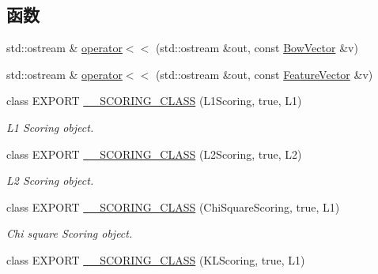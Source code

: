 \subsection*{函数}
\begin{DoxyCompactItemize}
\item 
std\-::ostream \& \hyperlink{namespaceDBoW2_a06d2058b1bde1cdc49f277fec62073e2}{operator$<$$<$} (std\-::ostream \&out, const \hyperlink{classDBoW2_1_1BowVector}{Bow\-Vector} \&v)
\item 
std\-::ostream \& \hyperlink{namespaceDBoW2_ac65e2bfb945a77c5294d0300a4fed49c}{operator$<$$<$} (std\-::ostream \&out, const \hyperlink{classDBoW2_1_1FeatureVector}{Feature\-Vector} \&v)
\item 
\hypertarget{namespaceDBoW2_a366d1d4a75ab8276e171af0aaa04b29b}{class E\-X\-P\-O\-R\-T \hyperlink{namespaceDBoW2_a366d1d4a75ab8276e171af0aaa04b29b}{\-\_\-\-\_\-\-S\-C\-O\-R\-I\-N\-G\-\_\-\-C\-L\-A\-S\-S} (L1\-Scoring, true, L1)}\label{namespaceDBoW2_a366d1d4a75ab8276e171af0aaa04b29b}

\begin{DoxyCompactList}\small\item\em L1 Scoring object. \end{DoxyCompactList}\item 
\hypertarget{namespaceDBoW2_a38216a543c4968d22bf2ffd2178e299c}{class E\-X\-P\-O\-R\-T \hyperlink{namespaceDBoW2_a38216a543c4968d22bf2ffd2178e299c}{\-\_\-\-\_\-\-S\-C\-O\-R\-I\-N\-G\-\_\-\-C\-L\-A\-S\-S} (L2\-Scoring, true, L2)}\label{namespaceDBoW2_a38216a543c4968d22bf2ffd2178e299c}

\begin{DoxyCompactList}\small\item\em L2 Scoring object. \end{DoxyCompactList}\item 
\hypertarget{namespaceDBoW2_adc330022cadf004b7ed5b84203287039}{class E\-X\-P\-O\-R\-T \hyperlink{namespaceDBoW2_adc330022cadf004b7ed5b84203287039}{\-\_\-\-\_\-\-S\-C\-O\-R\-I\-N\-G\-\_\-\-C\-L\-A\-S\-S} (Chi\-Square\-Scoring, true, L1)}\label{namespaceDBoW2_adc330022cadf004b7ed5b84203287039}

\begin{DoxyCompactList}\small\item\em Chi square Scoring object. \end{DoxyCompactList}\item 
\hypertarget{namespaceDBoW2_a9af1c21239089d77c337c65fac3e7bf5}{class E\-X\-P\-O\-R\-T \hyperlink{namespaceDBoW2_a9af1c21239089d77c337c65fac3e7bf5}{\-\_\-\-\_\-\-S\-C\-O\-R\-I\-N\-G\-\_\-\-C\-L\-A\-S\-S} (K\-L\-Scoring, true, L1)}\label{namespaceDBoW2_a9af1c21239089d77c337c65fac3e7bf5}


\end{DoxyCompactItemize}
